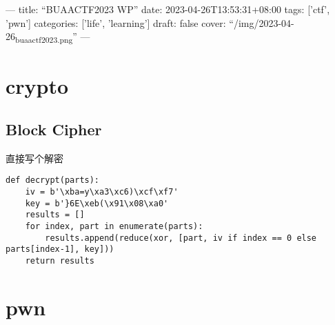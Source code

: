 \documentclass[11pt]{article}
\author{John Doe}
\date{\today}
\title{}
\begin{document}
\tableofcontents

---
title: ``BUAACTF2023 WP''
date: 2023-04-26T13:53:31+08:00
tags: ['ctf', 'pwn']
categories: ['life', 'learning']
draft: false
cover: ``/img/2023-04-26\textsubscript{buaactf2023.png}''
---
\section{crypto}
\label{sec:orgad136fb}
\subsection{Block Cipher}
\label{sec:org9416cbf}
直接写个解密
\begin{verbatim}
def decrypt(parts):
    iv = b'\xba=y\xa3\xc6)\xcf\xf7'
    key = b'}6E\xeb(\x91\x08\xa0'
    results = []
    for index, part in enumerate(parts):
        results.append(reduce(xor, [part, iv if index == 0 else parts[index-1], key]))
    return results
\end{verbatim}

\section{pwn}
\label{sec:org2c4c82a}
\end{document}
